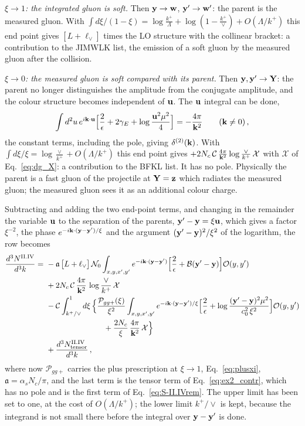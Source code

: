 \emph{$\xi\to1$: the integrated gluon is soft.} Then $\mathbf{y}\to\mathbf{w}$, $\mathbf{y}'\to\mathbf{w}'$: the parent is the measured gluon. With $\int d\xi/(1-\xi)=\log\frac{k^+}{\Lambda}+\log(1-\frac{k^+}{\vee})+O(\Lambda/k^+)$ this end point gives $[L+\ell_\vee]$ times the LO structure with the collinear bracket: a contribution to the JIMWLK list, the emission of a soft gluon by the measured gluon after the collision.

\emph{$\xi\to0$: the measured gluon is soft compared with its parent.} Then $\mathbf{y},\mathbf{y}'\to\mathbf{Y}$: the parent no longer distinguishes the amplitude from the conjugate amplitude, and the colour structure becomes independent of $\mathbf{u}$. The $\mathbf{u}$ integral can be done,
\begin{align}\label{eq:ex2_uint}
\int d^2u\,e^{i\mathbf{k}\cdot\mathbf{u}}\Big[\frac2\epsilon+2\gamma_E+\log\frac{\mathbf{u}^2\mu^2}{4}\Big]=-\frac{4\pi}{\mathbf{k}^2}\qquad(\mathbf{k}\neq0)\,,
\end{align}
the constant terms, including the pole, giving $\delta^{(2)}(\mathbf{k})$. With $\int d\xi/\xi=\log\frac{\vee}{k^+}+O(\Lambda/k^+)$ this end point gives $+2N_c\,\mathcal C\,\frac{4\pi}{\mathbf{k}^2}\log\frac{\vee}{k^+}\,\mathcal X$ with $\mathcal X$ of Eq.~\eqref{eq:dg_X}: a contribution to the BFKL list. It has no pole. Physically the parent is a fast gluon of the projectile at $\mathbf{Y}=\mathbf{z}$ which radiates the measured gluon; the measured gluon sees it as an additional colour charge.

Subtracting and adding the two end-point terms, and changing in the remainder the variable $\mathbf{u}$ to the separation of the parents, $\mathbf{y}'-\mathbf{y}=\xi\mathbf{u}$, which gives a factor $\xi^{-2}$, the phase $e^{-i\mathbf{k}\cdot(\mathbf{y}-\mathbf{y}')/\xi}$ and the argument $(\mathbf{y}'-\mathbf{y})^2/\xi^2$ of the logarithm, the row becomes
\begin{align}\label{eq:ex2_split}
\frac{d^3N^{\rm II.IV}}{d^3k}=\ &-\mathfrak a\,\big[L+\ell_\vee\big]\,\mathcal N_0\int_{x,y,x',y'}e^{-i\mathbf{k}\cdot(\mathbf{y}-\mathbf{y}')}\Big[\frac2\epsilon+\mathcal B(\mathbf{y}'-\mathbf{y})\Big]\mathcal O(y,y')\notag\\
&+2N_c\,\mathcal C\,\frac{4\pi}{\mathbf{k}^2}\,\log\frac{\vee}{k^+}\,\mathcal X\notag\\
&-\mathcal C\int_{k^+/\vee}^1d\xi\,\Big\{\frac{\mathcal P_{gg+}(\xi)}{\xi^2}\int_{x,y,x',y'}e^{-i\mathbf{k}\cdot(\mathbf{y}-\mathbf{y}')/\xi}\Big[\frac2\epsilon+\log\frac{(\mathbf{y}'-\mathbf{y})^2\mu^2}{c_0^2\,\xi^2}\Big]\mathcal O(y,y')\notag\\
&\hspace{2.6cm}+\frac{2N_c}{\xi}\,\frac{4\pi}{\mathbf{k}^2}\,\mathcal X\Big\}\notag\\
&+\frac{d^3N^{\rm II.IV}_{\rm tensor}}{d^3k}\,,
\end{align}
where now $\mathcal P_{gg+}$ carries the plus prescription at $\xi\to1$, Eq.~\eqref{eq:plusxi}, $\mathfrak a=\alpha_sN_c/\pi$, and the last term is the tensor term of Eq.~\eqref{eq:ex2_contr}, which has no pole and is the first term of Eq.~\eqref{eq:S-II.IVrem}. The upper limit has been set to one, at the cost of $O(\Lambda/k^+)$; the lower limit $k^+/\vee$ is kept, because the integrand is not small there before the integral over $\mathbf{y}-\mathbf{y}'$ is done.

